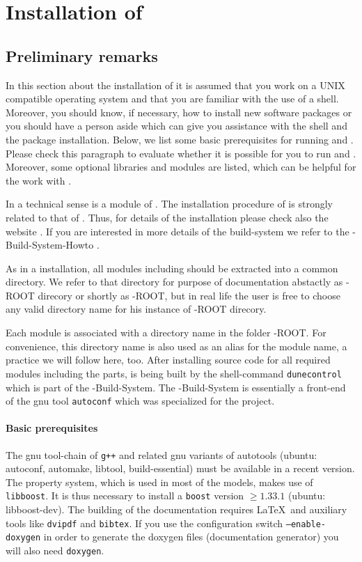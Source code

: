 \section{Installation of \Dumux} \label{install}
\subsection{Preliminary remarks}

In this section about the installation of \Dumux it is assumed that you work on a UNIX compatible operating system and that you are familiar with the use of a shell. 
Moreover, you should know,  if necessary, how to install new software packages or you should have a person aside which can give you assistance with the shell and the package installation. 
Below, we list some basic prerequisites for running \Dune and \Dumux. 
Please check this paragraph to evaluate whether it is possible for you to run \Dune and \Dumux. 
Moreover, some optional libraries and modules are listed, which can be helpful for the work with \Dumux. 

In a technical sense \Dumux is a module of \Dune. 
The installation procedure of \Dumux is strongly related to that of \Dune. 
Thus, for details of the installation please check also the {\Dune} website \cite{DUNE-HP}. 
If you are interested in more details of the build-system we refer to the {\Dune}-Build-System-Howto \cite{DUNE-HP}.

As in a \Dune installation, all \Dune modules including \Dumux should be extracted into a common directory. We refer to that directory for purpose of documentation abstactly as {\Dune}-ROOT direcory or shortly as {\Dune}-ROOT, but in real life the user is free to choose any valid directory name for his instance of {\Dune}-ROOT direcory.

Each \Dune module is associated with a directory name in the folder {\Dune}-ROOT. For convenience, this directory name is  also used as an alias for the module name, a practice we will follow here, too. After installing source code for all required \Dune modules including the \Dumux parts, \Dune is being built by the shell-command \texttt{dunecontrol} which is part of the {\Dune}-Build-System. The {\Dune}-Build-System is essentially a front-end of the gnu tool \texttt{autoconf} which was specialized for the \Dune project.

\paragraph{Basic prerequisites} \label{prerequisites}
The gnu tool-chain of \texttt{g++}  and related gnu variants of autotools (ubuntu: autoconf, automake, libtool, build-essential) must be available in a recent version. 
The \Dumux property system, which is used in most of the models, makes use of \texttt{libboost}. 
It is thus necessary to install a  \texttt{boost}  version $\geqslant 1.33.1$ (ubuntu: libboost-dev). 
The building of the documentation requires \LaTeX\ and auxiliary tools like \texttt{dvipdf} and \texttt{bibtex}. 
If you use the configuration switch \texttt{--enable-doxygen} in order to generate the doxygen files (documentation generator) you will also need \texttt{doxygen}.

